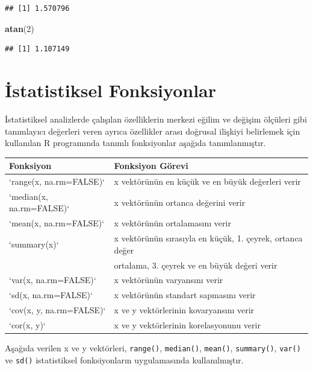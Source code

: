 \documentclass[
]{book}
\newenvironment{Shaded}{\begin{snugshade}}{\end{snugshade}}
\newcommand{\DecValTok}[1]{\textcolor[rgb]{0.00,0.00,0.81}{#1}}
\newcommand{\FunctionTok}[1]{\textcolor[rgb]{0.13,0.29,0.53}{\textbf{#1}}}
\newcommand{\NormalTok}[1]{#1}
\begin{document}
\begin{verbatim}
## [1] 1.570796
\end{verbatim}

\begin{Shaded}
\begin{Highlighting}[]
\FunctionTok{atan}\NormalTok{(}\DecValTok{2}\NormalTok{)}
\end{Highlighting}
\end{Shaded}

\begin{verbatim}
## [1] 1.107149
\end{verbatim}

\section{İstatistiksel Fonksiyonlar}\label{istatistiksel-fonksiyonlar}

İstatistiksel analizlerde çalışılan özelliklerin merkezi eğilim ve değişim ölçüleri gibi tanımlayıcı değerleri veren ayrıca özellikler arası doğrusal ilişkiyi belirlemek için kullanılan R programında tanımlı fonksiyonlar aşağıda tanımlanmıştır.

\begin{tabular}{ll}
\toprule
Fonksiyon & Fonksiyon Görevi\\
\midrule
`range(x, na.rm=FALSE)` & x vektörünün en küçük ve en büyük değerleri verir\\
`median(x, na.rm=FALSE)` & x vektörünün ortanca değerini verir\\
`mean(x, na.rm=FALSE)` & x vektörünün ortalamasını verir\\
`summary(x)` & x vektörünün sırasıyla en küçük, 1. çeyrek, ortanca değer\\
 & ortalama, 3. çeyrek ve en büyük değeri verir\\
\addlinespace
`var(x, na.rm=FALSE)` & x vektörünün varyansını verir\\
`sd(x, na.rm=FALSE)` & x vektörünün standart sapmasını verir\\
`cov(x, y, na.rm=FALSE)` & x ve y vektörlerinin kovaryansını verir\\
`cor(x, y)` & x ve y vektörlerinin korelasyonunu verir\\
\bottomrule
\end{tabular}

Aşağıda verilen x ve y vektörleri, \texttt{range()}, \texttt{median()}, \texttt{mean()}, \texttt{summary()}, \texttt{var()} ve \texttt{sd()} istatistiksel fonksiyonların uygulamasında kullanılmıştır.
\end{document}
